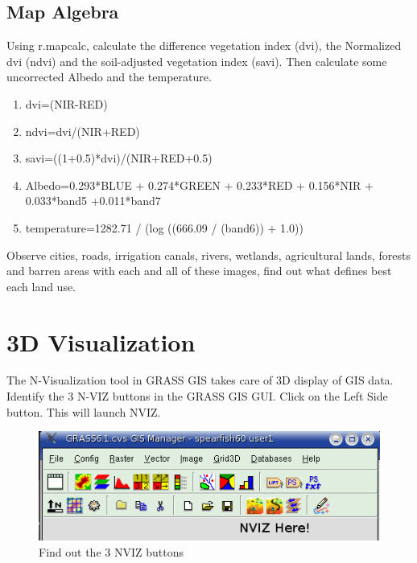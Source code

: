 \subsection{Map Algebra}
\label{map_algebra}

Using r.mapcalc, calculate the difference vegetation index (dvi), the Normalized dvi (ndvi) and the soil-adjusted vegetation index (savi). Then calculate some uncorrected Albedo and the temperature.

\begin{enumerate}
 \item dvi=(NIR-RED)
 \item ndvi=dvi/(NIR+RED)
 \item savi=((1+0.5)*dvi)/(NIR+RED+0.5)
 \item Albedo=0.293*BLUE + 0.274*GREEN + 0.233*RED + 0.156*NIR + 0.033*band5 +0.011*band7
 \item temperature=1282.71 / (log ((666.09 / (band6)) + 1.0))
\end{enumerate}

Observe cities, roads, irrigation canals, rivers, wetlands, agricultural lands, forests and barren areas with each and all of these images, find out what defines best each land use.

\newpage
\section{3D Visualization}
\label{3D_visualization}


The N-Visualization tool in GRASS GIS takes care of 3D display of GIS data. Identify the 3 N-VIZ buttons in the GRASS GIS GUI. Click on the Left Side button. This will launch NVIZ.

\begin{figure}[htbp]
   \centering
   \includegraphics[scale=0.35]{nviz000.png}
   \caption{Find out the 3 NVIZ buttons}
   \label{fig:nviz000}
\end{figure}


